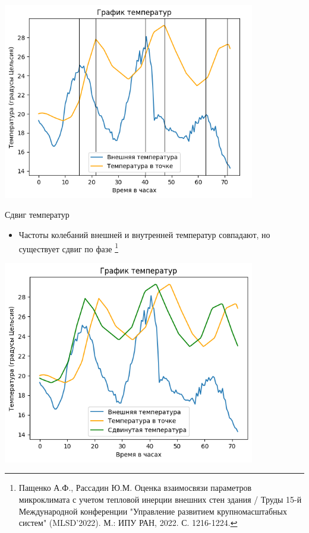 \documentclass[14pt,aspectratio=169,hyperref={pdftex,unicode},xcolor=dvipsnames]{beamer}
\begin{document}
\begin{frame} \begin{center}
\includegraphics[width=11cm]{images/graphics/indent.png}
\end{center} \end{frame}



\begin{frame}{Сдвиг температур}

\begin{itemize}
\item Частоты колебаний внешней и внутренней температур совпадают, но существует сдвиг по фазе \footnote{Пащенко А.Ф., Рассадин Ю.М. Оценка взаимосвязи параметров микроклимата с учетом тепловой инерции внешних стен здания / Труды 15-й Международной конференции "Управление развитием крупномасштабных систем" (MLSD’2022). М.: ИПУ РАН, 2022. С. 1216-1224.}
\end{itemize}

\end{frame}



\begin{frame} \begin{center}
\includegraphics[width=11cm]{images/graphics/indent_2.png}
\end{center} \end{frame}
\end{document}
